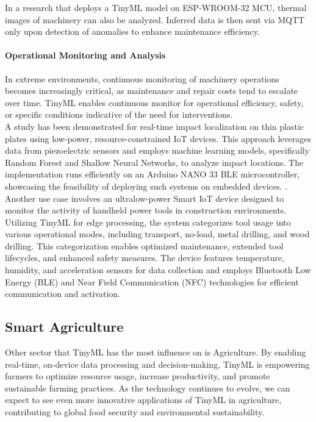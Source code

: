 \documentclass[twocolumn]{article}
\begin{document}
In a research that deploys a TinyML model on ESP-WROOM-32 MCU, thermal images of machinery can also be analyzed. Inferred data is then sent via MQTT only upon detection of anomalies to enhance maintenance efficiency. \cite{oliveira_edge_2022}

\paragraph{Operational Monitoring and Analysis}

In extreme environments, continuous monitoring of machinery operations becomes increasingly critical, as maintenance and repair costs tend to escalate over time. TinyML enables continuous monitor for operational efficiency, safety, or specific conditions indicative of the need for interventions.\cite{aemt_navigating_nodate}\\[0.1cm]

A study has been demonstrated for real-time impact localization on thin plastic plates using low-power, resource-constrained IoT devices. This approach leverages data from piezoelectric sensors and employs machine learning models, specifically Random Forest and Shallow Neural Networks, to analyze impact locations. The implementation runs efficiently on an Arduino NANO 33 BLE microcontroller, showcasing the feasibility of deploying such systems on embedded devices. \cite{noauthor_smart_nodate}.\\[0.1cm]


Another use case involves an ultralow-power Smart IoT device designed to monitor the activity of handheld power tools in construction environments. Utilizing TinyML for edge processing, the system categorizes tool usage into various operational modes, including transport, no-load, metal drilling, and wood drilling. This categorization enables optimized maintenance, extended tool lifecycles, and enhanced safety measures. The device features temperature, humidity, and acceleration sensors for data collection and employs Bluetooth Low Energy (BLE) and Near Field Communication (NFC) technologies for efficient communication and activation. \cite{giordano_design_2022}


\subsection{Smart Agriculture}
Other sector that TinyML has the most influence on is Agriculture.  By enabling real-time, on-device data processing and decision-making, TinyML is empowering farmers to optimize resource usage, increase productivity, and promote sustainable farming practices. As the technology continues to evolve, we can expect to see even more innovative applications of TinyML in agriculture, contributing to global food security and environmental sustainability.
\end{document}

